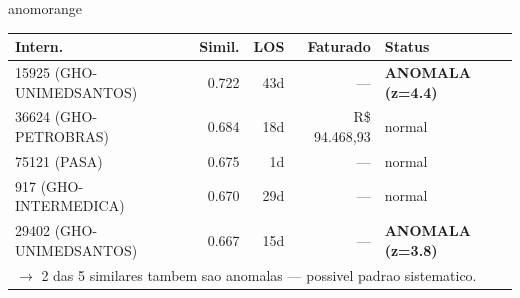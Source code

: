 \documentclass[a4paper,10pt]{article}
\begin{document}
\begin{anomalycard}[Internacao 9674 | GHO-POSTAL | ALTO (z=3.63)]{anomorange}
\begin{tabular}{l r r r l}\toprule\textbf{Intern.} & \textbf{Simil.} & \textbf{LOS} & \textbf{Faturado} & \textbf{Status} \\\midrule
15925 (GHO-UNIMEDSANTOS) & 0.722 & 43d & --- & \textcolor{anomred}{\textbf{ANOMALA (z=4.4)}} \\
36624 (GHO-PETROBRAS) & 0.684 & 18d & R\$ 94.468,93 & \textcolor{jcubeblue}{normal} \\
75121 (PASA) & 0.675 & 1d & --- & \textcolor{jcubeblue}{normal} \\
917 (GHO-INTERMEDICA) & 0.670 & 29d & --- & \textcolor{jcubeblue}{normal} \\
29402 (GHO-UNIMEDSANTOS) & 0.667 & 15d & --- & \textcolor{anomred}{\textbf{ANOMALA (z=3.8)}} \\
\multicolumn{5}{l}{\textcolor{anomred}{\small $\rightarrow$ 2 das 5 similares tambem sao anomalas --- possivel padrao sistematico.}} \\
\bottomrule\end{tabular}


\end{anomalycard}

\newpage
\end{document}
